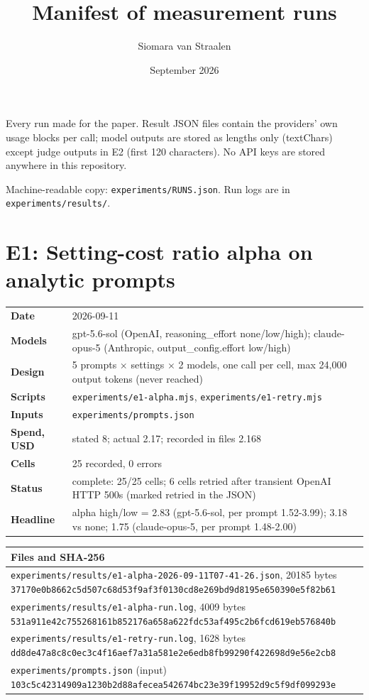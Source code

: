 \documentclass[11pt]{article}
\title{Manifest of measurement runs}
\author{Siomara van Straalen}
\date{September 2026}
\begin{document}
\maketitle
Every run made for the paper. Result JSON files contain the providers' own usage blocks per call; model outputs are stored as lengths only (textChars) except judge outputs in E2 (first 120 characters). No API keys are stored anywhere in this repository.

Machine-readable copy: \texttt{experiments/RUNS.json}. Run logs are in \texttt{experiments/results/}.

\section*{E1: Setting-cost ratio alpha on analytic prompts}
\begin{longtable}{@{}p{}p{}@{}}\toprule
\textbf{Date} & 2026-09-11 \\
\textbf{Models} & gpt-5.6-sol (OpenAI, reasoning\_effort none/low/high); claude-opus-5 (Anthropic, output\_config.effort low/high) \\
\textbf{Design} & 5 prompts $\times$ settings $\times$ 2 models, one call per cell, max 24,000 output tokens (never reached) \\
\textbf{Scripts} & \texttt{experiments/e1-alpha.mjs}, \texttt{experiments/e1-retry.mjs} \\
\textbf{Inputs} & \texttt{experiments/prompts.json} \\
\textbf{Spend, USD} & stated 8; actual 2.17; recorded in files 2.168 \\
\textbf{Cells} & 25 recorded, 0 errors \\
\textbf{Status} & complete: 25/25 cells; 6 cells retried after transient OpenAI HTTP 500s (marked retried in the JSON) \\
\textbf{Headline} & alpha high/low = 2.83 (gpt-5.6-sol, per prompt 1.52-3.99); 3.18 vs none; 1.75 (claude-opus-5, per prompt 1.48-2.00) \\
\bottomrule\end{longtable}
\begin{longtable}{@{}p{}@{}}\toprule
\textbf{Files and SHA-256} \\\midrule
\texttt{experiments/results/e1-alpha-2026-09-11T07-41-26.json}, 20185 bytes \newline \texttt{\scriptsize 37170e0b8662c5d507c68d53f9af3f0130cd8e269bd9d8195e650390e5f82b61} \\[2pt]
\texttt{experiments/results/e1-alpha-run.log}, 4009 bytes \newline \texttt{\scriptsize 531a911e42c755268161b852176a658a622fdc53af495c2b6fcd619eb576840b} \\[2pt]
\texttt{experiments/results/e1-retry-run.log}, 1628 bytes \newline \texttt{\scriptsize dd8de47a8c8c0ec3c4f16aef7a31a581e2e6edb8fb99290f422698d9e56e2cb8} \\[2pt]
\texttt{experiments/prompts.json} (input) \newline \texttt{\scriptsize 103c5c42314909a1230b2d88afecea542674bc23e39f19952d9c5f9df099293e} \\[2pt]
\bottomrule\end{longtable}
\end{document}
